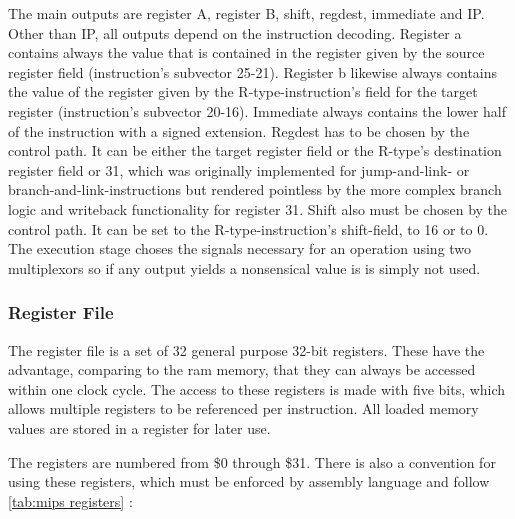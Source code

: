 The main outputs are register A, register B, shift, regdest, immediate and IP. Other than IP, all outputs depend on the instruction decoding. Register a contains always the value that is contained in the register given by the source register field (instruction's subvector 25-21). Register b likewise always contains the value of the register given by the R-type-instruction's field for the target register (instruction's subvector 20-16). Immediate always contains the lower half of the instruction with a signed extension. Regdest has to be chosen by the control path. It can be either the target register field or the R-type's destination register field or 31, which was originally implemented for jump-and-link- or branch-and-link-instructions but rendered pointless by the more complex branch logic and writeback functionality for register 31. Shift also must be chosen by the control path. It can be set to the R-type-instruction's shift-field, to 16 or to 0. The execution stage choses the signals necessary for an operation using two multiplexors so if any output yields a nonsensical value is is simply not used.

\subsubsection{Register File}
The register file is a set of 32 general purpose 32-bit registers. These have the advantage, comparing to the ram memory, that they can always be accessed within one clock cycle.
The access to these registers is made with five bits, which allows multiple registers to be referenced per instruction. All loaded memory values are stored in a register
for later use.

The registers are numbered from \$0 through \$31. There is also a convention for using these registers, which must be enforced by assembly language and follow \autoref{tab:mips registers} 
\cite{regfiles}:

